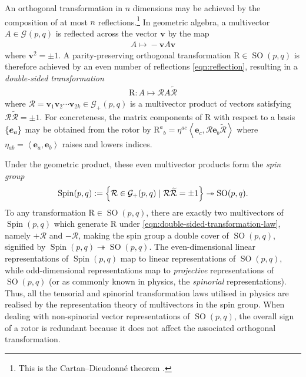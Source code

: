 \documentclass[12pt,a4paper]{article}
\renewcommand{\vb}[1]{\boldsymbol{#1}}
\newcommand{\ve}[1]{\vb{e}_{#1}}
\renewcommand{\ip}[2]{\left\langle#1,#2\right\rangle}
\newcommand{\GA}[1][]{\mathcal{G}_{#1}}
\newcommand{\rotor}[1]{\mathcal{#1}}
\newcommand{\linmap}[1]{\mathrm{#1}}
\newcommand{\rev}[1]{\widetilde{#1}}
\DeclareMathOperator{\SO}{SO}
\DeclareMathOperator{\Spin}{Spin}
\begin{document}
An orthogonal transformation in $n$ dimensions may be achieved by the composition of at most $n$ reflections.\footnote{This is the Cartan--Dieudonn\'{e}{} theorem \cite{cartan-dieudonne-theorem}.}
In geometric algebra, a multivector $A \in{} \GA(p,q)$ is reflected across the vector $\vb{v}{}$ by the map
\begin{align}
	A \mapsto{} -\vb{v}{}A\vb{v}{}
	\label{eqn:reflection}
\end{align}
where $\vb{v}{}^2 = \pm{}1$.
A parity-preserving orthogonal transformation $\linmap R \in{} \SO(p, q)$ is therefore achieved by an even number of reflections \eqref{eqn:reflection}, resulting in a \emph{double-sided transformation}
\begin{align}
	\linmap R : A \mapsto \rotor R A \rev{\rotor R}
	\label{eqn:double-sided-transformation-law}
\end{align}
where $\rotor R = \vb{v}{}_1\vb{v}{}_2\cdots \vb{v}{}_{2k} \in \GA[+](p,q)$ is a multivector product of vectors satisfying $\rotor R\rev{\rotor R} = \pm{}1$.
For concreteness, the matrix components of $\linmap R$ with respect to a basis $\qty{\ve a}$ may be obtained from the rotor by $\linmap R^a{}_b = \eta{}^{ac}\ip{\ve c}{\rotor R \ve b \rev{\rotor R}}$ where $\eta{}_{ab} = \ip{\ve a}{\ve b}$ raises and lowers indices.


Under the geometric product, these even multivector products form the \emph{spin group}
\begin{align}
	\Spin(p, q) :={} \qty{\rotor R \in \GA[+](p, q) \mid \rotor R\rev{\rotor R} = \pm{}1} \twoheadrightarrow \SO(p, q)
.\end{align}
To any transformation $\linmap R \in \SO(p, q)$, there are exactly two multivectors of $\Spin(p, q)$ which generate $\linmap R$ under \eqref{eqn:double-sided-transformation-law}, namely $+\rotor R$ and $-\rotor R$, making the spin group a double cover of $\SO(p,q)$, signified by $\Spin(p, q) \twoheadrightarrow \SO(p, q)$.
The even-dimensional linear representations of $\Spin(p, q)$ map to linear representations of $\SO(p, q)$, while odd-dimensional representations map to \emph{projective} representations of $\SO(p,q)$ (or as commonly known in physics, the \emph{spinorial} representations).
Thus, all the tensorial and spinorial transformation laws utilised in physics are realised by the representation theory of multivectors in the spin group.
When dealing with non-spinorial vector representations of $\SO(p, q)$, the overall sign of a rotor is redundant because it does not affect the associated orthogonal transformation.
\end{document}
